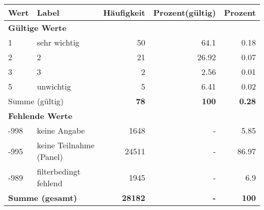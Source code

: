      \begin{longtable}{lXrrr}
     \toprule
     \textbf{Wert} & \textbf{Label} & \textbf{Häufigkeit} & \textbf{Prozent(gültig)} & \textbf{Prozent} \\
     \endhead
     \midrule
     \multicolumn{5}{l}{\textbf{Gültige Werte}}\\

     1 &
     \multicolumn{1}{X}{ sehr wichtig   } &


       \num{50} &
       \num[round-mode=places,round-precision=2]{64.1} &
         \num[round-mode=places,round-precision=2]{0.18} \\

     2 &
     \multicolumn{1}{X}{ 2   } &


       \num{21} &
       \num[round-mode=places,round-precision=2]{26.92} &
         \num[round-mode=places,round-precision=2]{0.07} \\

     3 &
     \multicolumn{1}{X}{ 3   } &


       \num{2} &
       \num[round-mode=places,round-precision=2]{2.56} &
         \num[round-mode=places,round-precision=2]{0.01} \\

     5 &
     \multicolumn{1}{X}{ unwichtig   } &


       \num{5} &
       \num[round-mode=places,round-precision=2]{6.41} &
         \num[round-mode=places,round-precision=2]{0.02} \\
     \midrule
     \multicolumn{2}{l}{Summe (gültig)} &
       \textbf{\num{78}} &
     \textbf{100} &
       \textbf{\num[round-mode=places,round-precision=2]{0.28}} \\
     \multicolumn{5}{l}{\textbf{Fehlende Werte}}\\
       -998 &
       keine Angabe &
         \num{1648} &
        - &
         \num[round-mode=places,round-precision=2]{5.85} \\
       -995 &
       keine Teilnahme (Panel) &
         \num{24511} &
        - &
         \num[round-mode=places,round-precision=2]{86.97} \\
       -989 &
       filterbedingt fehlend &
         \num{1945} &
        - &
         \num[round-mode=places,round-precision=2]{6.9} \\
     \midrule
     \multicolumn{2}{l}{\textbf{Summe (gesamt)}} &
          \textbf{\num{28182}} &
        \textbf{-} &
        \textbf{100} \\
     \bottomrule
     \end{longtable}
     
